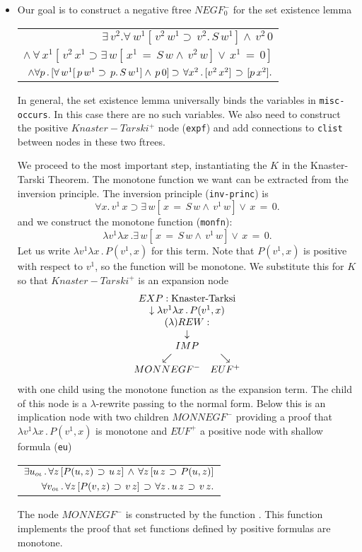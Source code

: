 \begin{enumerate}
\begin{itemize}
\item {\bf {}}
Our goal is to construct a negative ftree $NEGF_0^-$ for the set existence lemma
\begin{center}
\begin{tabular}{r}
$ \exists \,v^2 . \forall \,w^1 [ \,v^2 \,w^1 \supset \,v^2 . \,S \,w^1 ] \land \,v^2 \,0$ \\
$\land \, \forall \,x^1 [ \,v^2 \,x^1 \supset \exists \,w [ \,x^1 \,= \,S \,w \land \,v^2 \,w ] \lor \,x^1 \,= \,0 ]$ \\
$\land \forall p\, .\, [\forall \,w^1 [ \,p \,w^1 \supset \,p . \,S \,w^1 ] \land \,p \,0]
\mathbin{\supset}\, \forall x^2\, . \, [v^2\, x^2]\,\mathbin{\supset}\, [p\, x^2].$ \\
\end{tabular}
\end{center}
In general, the set existence lemma universally binds the variables
in \verb+misc-occurs+.  In this case there are no such variables.
We also need to construct the positive $Knaster-Tarski^+$ node (\verb+expf+)
and add connections to \verb+clist+ between nodes in these two ftrees.

We proceed to the most important step, instantiating the $K$ in
the Knaster-Tarski Theorem.  The monotone function we want can
be extracted from the inversion principle.  The inversion principle (\verb+inv-princ+)
is
$$\forall x . \,v^1 \,x \supset \exists \,w [ \,x \,= \,S \,w \land \,v^1 \,w] \lor \,x \,= \,0.$$
and we construct the monotone function (\verb+monfn+):
$$\lambda v^1 \lambda x\, . \exists \,w [ \,x \,= \,S \,w \land \,v^1 \,w] \lor \,x \,= \,0.$$
Let us write $\lambda v^1\lambda x\, . \, P(v^1,x)$ for this term.
Note that $P(v^1,x)$ is positive with respect to $v^1$, so the function will be monotone.
We substitute this for $K$ so that $Knaster-Tarski^+$ is an expansion node
$${{\begin{array}[t]{c}EXP: \mbox{Knaster-Tarksi} \\ \begin{array}[t]{c} \downarrow \lambda v^1\lambda x\, . \, P(v^1,x) \\ {{\begin{array}[t]{c}(\lambda)REW:  \\ \begin{array}[t]{c} \downarrow \\ {{\begin{array}[t]{c}IMP \\ \begin{array}[t]{cc} \swarrow & \searrow \\ MONNEGF^- & EUF^+ \end{array}\end{array}}}\end{array}\end{array}}}\end{array}\end{array}}}$$
with one child using the monotone function as the expansion term.
The child of this node is a $\lambda$-rewrite passing to the normal form.
Below this is an implication node with two children $MONNEGF^-$ providing
a proof that $\lambda v^1\lambda x\, . \, P(v^1,x)$ is monotone and $EUF^+$ a positive node with shallow formula (\verb+eu+)
\begin{center}
\begin{tabular}{r}
$\exists u_{o\iota} \, . \, \forall z\, [P(u,z)\, \mathbin{\supset} \, u\, z]
\,\land \,\forall z\, [u\, z\, \mathbin{\supset} \, P(u,z)]$ \\
$\forall v_{o\iota}\, . \, \forall z\, [P(v,z)\, \mathbin{\supset} \, v\, z]
\,\mathbin{\supset}\, \forall z\, .\, u\, z\, \mathbin{\supset} \, v\, z.$ \\
\end{tabular}
\end{center}
The node $MONNEGF^-$ is constructed by the function .
This function implements the proof that set functions defined by positive formulas
are monotone.


\end{itemize}
\end{enumerate}
